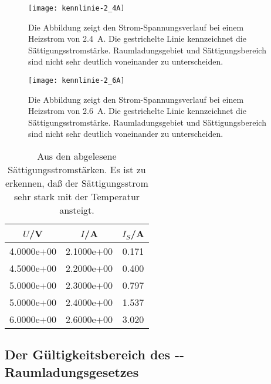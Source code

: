 \begin{figure}
  \centering
  \texttt{[image: kennlinie-2\_4A]}
  \caption{Die Abbildung zeigt den Strom-Spannungsverlauf bei einem
    Heizstrom von \SI{2.4}{\ampere}. Die gestrichelte Linie kennzeichnet
    die Sättigungsstromstärke. Raumladungsgebiet und Sättigungsbereich
    sind nicht sehr deutlich voneinander zu unterscheiden.}
  \label{fig:kennlinie-2.4A}
\end{figure}

\begin{figure}
  \centering
  \texttt{[image: kennlinie-2\_6A]}
  \caption{Die Abbildung zeigt den Strom-Spannungsverlauf bei einem
    Heizstrom von \SI{2.6}{\ampere}. Die gestrichelte Linie kennzeichnet
    die Sättigungsstromstärke. Raumladungsgebiet und Sättigungsbereich
    sind nicht sehr deutlich voneinander zu unterscheiden.}
  \label{fig:kennlinie-2.6A}
\end{figure}

\begin{table}
  \centering
  \begin{tabular}{SSS}
    \toprule
    {$U$/V} & {$I$/A} & {$I_S$/A} \\
    \midrule
    4.0000e+00 & 2.1000e+00 & 0.171 \\
    4.5000e+00 & 2.2000e+00 & 0.400 \\
    5.0000e+00 & 2.3000e+00 & 0.797 \\
    5.0000e+00 & 2.4000e+00 & 1.537 \\
    6.0000e+00 & 2.6000e+00 & 3.020 \\
    \bottomrule
  \end{tabular}
  \caption{Aus den 
    abgelesene Sättigungsstromstärken. Es ist zu erkennen, daß der
    Sättigungsstrom sehr stark mit der Temperatur ansteigt.}
  \label{tab:saettigung}
\end{table}

\subsection{Der Gültigkeitsbereich des
  --Raumladungsgesetzes}

